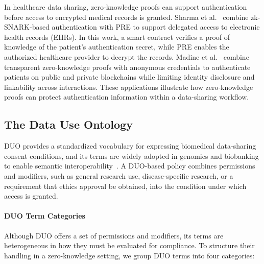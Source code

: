 In healthcare data sharing, zero-knowledge proofs can support authentication before access to encrypted medical records is granted.
Sharma et al.~\cite{sharma2020blockchain} combine zk-SNARK-based authentication with PRE to support delegated access to electronic health records (EHRs).
In this work, a smart contract verifies a proof of knowledge of the patient's authentication secret, while PRE enables the authorized healthcare provider to decrypt the records.
Madine et al.~\cite{madine2025zero} combine transparent zero-knowledge proofs with anonymous credentials to authenticate patients on public and private blockchains while limiting identity disclosure and linkability across interactions.
These applications illustrate how zero-knowledge proofs can protect authentication information within a data-sharing workflow.

\subsection{The Data Use Ontology}
\label{subsec:duo}
DUO provides a standardized vocabulary for expressing biomedical data-sharing consent conditions, and its terms are widely adopted in genomics and biobanking to enable semantic interoperability~\cite{lawson2021data, dyke2016consent}.
A DUO-based policy combines permissions and modifiers, such as general research use, disease-specific research, or a requirement that ethics approval be obtained, into the condition under which access is granted.

\paragraph{DUO Term Categories}
Although DUO offers a set of permissions and modifiers, its terms are heterogeneous in how they must be evaluated for compliance.
To structure their handling in a zero-knowledge setting, we group DUO terms into four categories:

